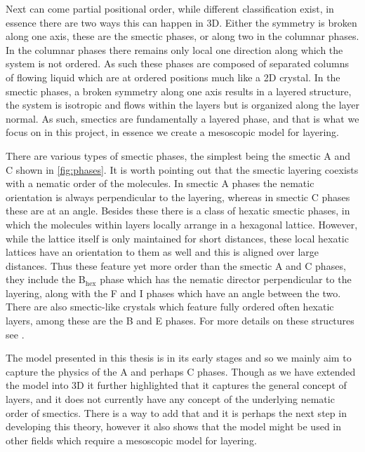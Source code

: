\documentclass[12pt]{article}
\begin{document}
Next can come partial positional order, while different classification exist, in essence there are two ways this can happen in 3D.
Either the symmetry is broken along one axis, these are the smectic phases, or along two in the columnar phases\cite{oswaldNematicCholestericLiquid2005}.
In the columnar phases there remains only local one direction along which the system is not ordered.
As such these phases are composed of separated columns of flowing liquid which are at ordered positions much like a 2D crystal.
In the smectic phases, a broken symmetry along one axis results in a layered structure, the system is isotropic and flows within the layers but is organized along the layer normal.
As such, smectics are fundamentally a layered phase, and that is what we focus on in this project, in essence we create a mesoscopic model for layering.

There are various types of smectic phases, the simplest being the smectic A and C shown in \cref{fig:phases}.
It is worth pointing out that the smectic layering coexists with a nematic order of the molecules.
In smectic A phases the nematic orientation is always perpendicular to the layering, whereas in smectic C phases these are at an angle.
Besides these there is a class of hexatic smectic phases, in which the molecules within layers locally arrange in a hexagonal lattice.
However, while the lattice itself is only maintained for short distances, these local hexatic lattices have an orientation to them as well and this is aligned over large distances.
Thus these feature yet more order than the smectic A and C phases, they include the B$_\text{hex}$ phase which has the nematic director perpendicular to the layering, along with the F and I phases which have an angle between the two.
There are also smectic-like crystals which feature fully ordered often hexatic layers, among these are the B and E phases.
For more details on these structures see \cite{oswaldNematicCholestericLiquid2005,oswaldSmecticColumnarLiquid2005b,gennesPhysicsLiquidCrystals1995}.


The model presented in this thesis is in its early stages and so we mainly aim to capture the physics of the A and perhaps C phases.
Though as we have extended the model into 3D it further highlighted that it captures the general concept of layers, and it does not currently have any concept of the underlying nematic order of smectics.
There is a way to add that and it is perhaps the next step in developing this theory, however it also shows that the model might be used in other fields which require a mesoscopic model for layering.
\end{document}
